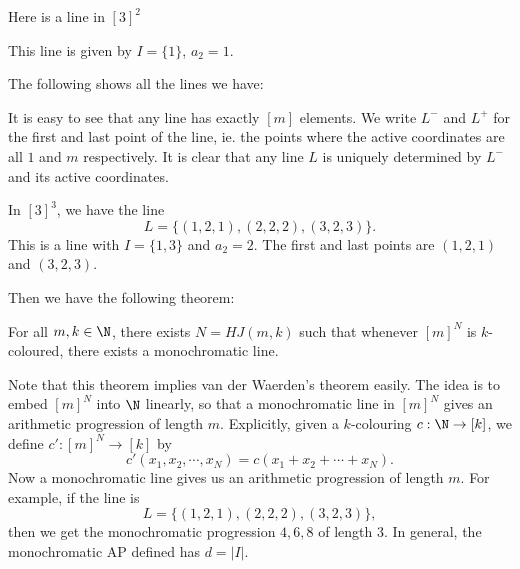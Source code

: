 \documentclass[a4paper]{article}
\begin{document}
\begin{eg}
  Here is a line in $[3]^2$
  \begin{center}
  \end{center}
  This line is given by $I = \{1\}$, $a_2 = 1$.

  The following shows all the lines we have:
  \begin{center}
  \end{center}
\end{eg}
It is easy to see that any line has exactly $[m]$ elements. We write $L^-$ and $L^+$ for the first and last point of the line, ie. the points where the active coordinates are all $1$ and $m$ respectively. It is clear that any line $L$ is uniquely determined by $L^-$ and its active coordinates.

\begin{eg}
  In $[3]^3$, we have the line
  \[
    L = \{(1, 2, 1), (2, 2, 2), (3, 2, 3)\}.
  \]
  This is a line with $I = \{1, 3\}$ and $a_2 = 2$. The first and last points are $(1, 2, 1)$ and $(3, 2, 3)$.
\end{eg}

Then we have the following theorem:
\begin{thm}
  For all $m, k \in \N$, there exists $N = HJ(m, k)$ such that whenever $[m]^N$ is $k$-coloured, there exists a monochromatic line.
\end{thm}
Note that this theorem implies van der Waerden's theorem easily. The idea is to embed $[m]^N$ into $\N$ linearly, so that a monochromatic line in $[m]^N$ gives an arithmetic progression of length $m$. Explicitly, given a $k$-colouring $c: \N \to [k]$, we define $c': [m]^N \to [k]$ by
\[
  c'(x_1, x_2, \cdots, x_N) = c(x_1 + x_2 + \cdots + x_N).
\]
Now a monochromatic line gives us an arithmetic progression of length $m$. For example, if the line is
\[
  L = \{(1, 2, 1), (2, 2, 2), (3, 2, 3)\},
\]
then we get the monochromatic progression $4, 6, 8$ of length $3$. In general, the monochromatic AP defined has $d = |I|$.
\end{document}
